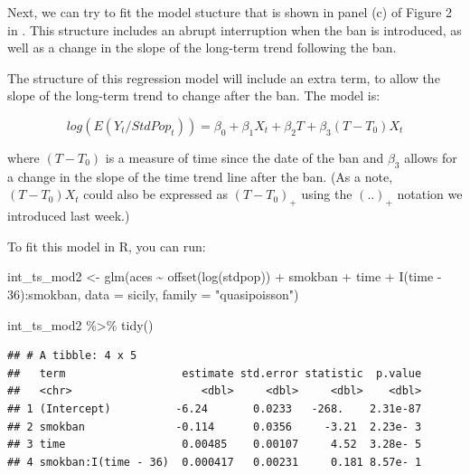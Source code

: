 \documentclass[
]{book}
\newenvironment{Shaded}{\begin{snugshade}}{\end{snugshade}}
\newcommand{\AttributeTok}[1]{\textcolor[rgb]{0.77,0.63,0.00}{#1}}
\newcommand{\DecValTok}[1]{\textcolor[rgb]{0.00,0.00,0.81}{#1}}
\newcommand{\FunctionTok}[1]{\textcolor[rgb]{0.00,0.00,0.00}{#1}}
\newcommand{\NormalTok}[1]{#1}
\newcommand{\OtherTok}[1]{\textcolor[rgb]{0.56,0.35,0.01}{#1}}
\newcommand{\SpecialCharTok}[1]{\textcolor[rgb]{0.00,0.00,0.00}{#1}}
\newcommand{\StringTok}[1]{\textcolor[rgb]{0.31,0.60,0.02}{#1}}
\begin{document}
Next, we can try to fit the model stucture that is shown in panel (c) of Figure 2 in \citet{bernal2017interrupted}. This structure includes an abrupt interruption when the ban is introduced, as well as a change in the slope of the long-term trend following the ban.

The structure of this regression model will include an extra term, to allow the slope of the long-term trend to change after the ban. The model is:

\[
log(E(Y_t/StdPop_t)) = \beta_0 + \beta_1 X_t + \beta_2 T + \beta_3 (T-T_0)X_t
\]

where \((T-T_0)\) is a measure of time since the date of the ban and \(\beta_3\) allows for a change in the slope of the time trend line after the ban. (As a note, \((T-T_0)X_t\) could also be expressed as \((T-T_0)_+\) using the \((..)_+\) notation we introduced last week.)

To fit this model in R, you can run:

\begin{Shaded}
\begin{Highlighting}[]
\NormalTok{int\_ts\_mod2 }\OtherTok{\textless{}{-}} \FunctionTok{glm}\NormalTok{(aces }\SpecialCharTok{\textasciitilde{}} \FunctionTok{offset}\NormalTok{(}\FunctionTok{log}\NormalTok{(stdpop)) }\SpecialCharTok{+}\NormalTok{ smokban }\SpecialCharTok{+}\NormalTok{ time }\SpecialCharTok{+} 
                     \FunctionTok{I}\NormalTok{(time }\SpecialCharTok{{-}} \DecValTok{36}\NormalTok{)}\SpecialCharTok{:}\NormalTok{smokban, }
                      \AttributeTok{data =}\NormalTok{ sicily, }
                      \AttributeTok{family =} \StringTok{"quasipoisson"}\NormalTok{)}
\end{Highlighting}
\end{Shaded}

\begin{Shaded}
\begin{Highlighting}[]
\NormalTok{int\_ts\_mod2 }\SpecialCharTok{\%\textgreater{}\%} 
  \FunctionTok{tidy}\NormalTok{()}
\end{Highlighting}
\end{Shaded}

\begin{verbatim}
## # A tibble: 4 x 5
##   term                  estimate std.error statistic  p.value
##   <chr>                    <dbl>     <dbl>     <dbl>    <dbl>
## 1 (Intercept)          -6.24       0.0233   -268.    2.31e-87
## 2 smokban              -0.114      0.0356     -3.21  2.23e- 3
## 3 time                  0.00485    0.00107     4.52  3.28e- 5
## 4 smokban:I(time - 36)  0.000417   0.00231     0.181 8.57e- 1
\end{verbatim}
\end{document}
